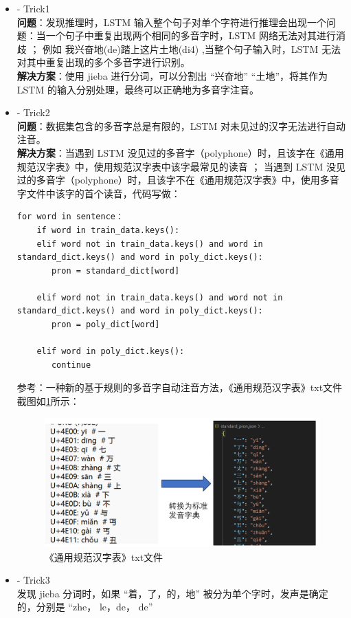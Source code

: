 \documentclass[12pt,hyperref,a4paper,UTF8]{ctexart}
\begin{document}
\begin{itemize}
  \item - Trick1 \\
  \textbf{问题}：发现推理时，LSTM 输入整个句子对单个字符进行推理会出现一个问题：当一个句子中重复出现两个相同的多音字时，LSTM 网络无法对其进行消歧 ； 例如 我兴奋地(de)踏上这片土地(di4) ,当整个句子输入时，LSTM 无法对其中重复出现的多个多音字进行识别。\\
  \textbf{解决方案}：使用 jieba 进行分词，可以分割出 “兴奋地” “土地”，将其作为 LSTM 的输入分别处理，最终可以正确地为多音字注音。
  \item - Trick2 \\
  \textbf{问题}：数据集包含的多音字总是有限的，LSTM 对未见过的汉字无法进行自动注音。\\
  \textbf{解决方案}：当遇到 LSTM 没见过的多音字（polyphone）时，且该字在《通用规范汉字表》中，使用规范汉字表中该字最常见的读音 ； 当遇到 LSTM 没见过的多音字（polyphone）时，且该字不在《通用规范汉字表》中，使用多音字文件中该字的首个读音，代码写做：
  \begin{lstlisting}[caption={Trick2实现代码}, label={lst:example}]
for word in sentence：
    if word in train_data.keys():
    elif word not in train_data.keys() and word in standard_dict.keys() and word in poly_dict.keys():
       pron = standard_dict[word]

    elif word not in train_data.keys() and word not in standard_dict.keys() and word in poly_dict.keys():
       pron = poly_dict[word]
       
    elif word in poly_dict.keys():
       continue
\end{lstlisting}
参考：一种新的基于规则的多音字自动注音方法，《通用规范汉字表》txt文件截图如\ref{fig:img6}所示：
\begin{figure}[H]
    \centering
    \includegraphics[width=0.5\linewidth]{figures/image6.png}
    \caption{《通用规范汉字表》txt文件}
    \label{fig:img6}
\end{figure}
  \item - Trick3 \\
  发现 jieba 分词时，如果 “着，了，的，地” 被分为单个字时，发声是确定的，分别是 “zhe， le，de， de”
\end{itemize}
\end{document}
